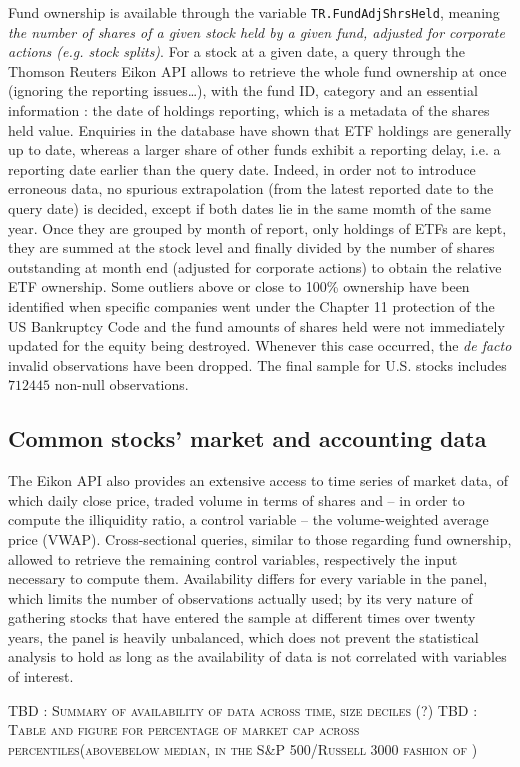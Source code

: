 Fund ownership is available through the variable \texttt{TR.FundAdjShrsHeld}, meaning \textit{the number of shares of a given stock held by a given fund, adjusted for corporate actions (e.g. stock splits)}. For a stock at a given date, a query through the Thomson Reuters Eikon API allows to retrieve the whole fund ownership at once (ignoring the reporting issues\dots), with the fund ID, category and an essential information : the date of holdings reporting, which is a metadata of the shares held value. Enquiries in the database have shown that ETF holdings are generally up to date, whereas a larger share of other funds exhibit a reporting delay, i.e. a reporting date earlier than the query date. Indeed, in order not to introduce erroneous data, no spurious extrapolation (from the latest reported date to the query date) is decided, except if both dates lie in the same momth of the same year. Once they are grouped by month of report, only holdings of ETFs are kept, they are summed at the stock level and finally divided by the number of shares outstanding at month end (adjusted for corporate actions) to obtain the relative ETF ownership. Some outliers above or close to 100\% ownership have been identified when specific companies went under the Chapter 11 protection of the US Bankruptcy Code and the fund amounts of shares held were not immediately updated for the equity being destroyed. Whenever this case occurred, the \textit{de facto} invalid observations have been dropped. The final sample for U.S. stocks includes $712445$ non-null observations.
\subsection{Common stocks' market and accounting data}
The Eikon API also provides an extensive access to time series of market data, of which daily close price, traded volume in terms of shares and -- in order to compute the \textcite{Amihud2002} illiquidity ratio, a control variable -- the volume-weighted average price (VWAP). Cross-sectional queries, similar to those regarding fund ownership, allowed to retrieve the remaining control variables, respectively the input necessary to compute them. Availability differs for every variable in the panel, which limits the number of observations actually used; by its very nature of gathering stocks that have entered the sample at different times over twenty years, the panel is heavily unbalanced, which does not prevent the statistical analysis to hold as long as the availability of data is not correlated with variables of interest.

\begin{center}
  \textsc{TBD : Summary of availability of data across time, size deciles (?)}
  \textsc{TBD : Table and figure for percentage of market cap across percentiles(above\/below median, in the S\&P 500/Russell 3000 fashion of \textcite{Ben-David2018})}
\end{center}


